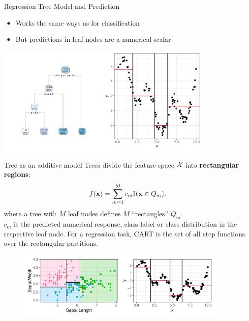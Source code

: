 \documentclass[11pt,compress,t,notes=noshow, xcolor=table]{beamer}
\begin{document}
\begin{vbframe}{Regression Tree Model and Prediction}
  \begin{itemize}
    \item Works the same ways as for classification
    \item But predictions in leaf nodes are a numerical scalar

  \end{itemize}
\vspace{1cm}
\color{fgcolor}
{\centering \includegraphics[width=0.8\textwidth, keepaspectratio]{figure/tree-regr-depth3.pdf}

}

\end{vbframe}



\begin{vbframe}{Tree as an additive model}
Trees divide the feature space $\mathcal{X}$ into \textbf{rectangular regions}: 
  \begin{align*}
    f(\mathbf{x}) = \sum_{m=1}^M c_m \mathbb{I}(\mathbf{x} \in Q_m),
  \end{align*}
  where a tree with $M$ leaf nodes defines $M$ \enquote{rectangles} $Q_m$.\\
  $c_m$ is the predicted numerical response, class label or class
  distribution in the respective leaf node.
  For a regression task, CART is the set of all step functions over the rectangular partitions.
  \begin{figure}
\includegraphics[width=0.92\textwidth, keepaspectratio]{figure/combined-area-plot.pdf}
\end{figure}

\end{vbframe}
\end{document}
